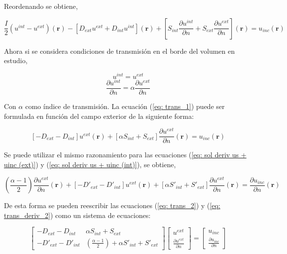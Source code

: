 \documentclass[12pt,letterpaper]{article}
\numberwithin{equation}{section}
\begin{document}
Reordenando se obtiene,

\begin{equation}
\frac{I}{2}(u^{int}- u^{ext})(\textbf{r}) - \left[D_{ext} u^{ext} + D_{int} u^{int}\right](\textbf{r}) + \left[S_{int} \frac{\partial u^{int}}{\partial n} + S_{ext} \frac{\partial u^{ext}}{\partial n}\right](\textbf{r}) = u_{inc}(\textbf{r}) 
\label{eq: trans_1}		
\end{equation}

Ahora si se considera condiciones de transmisión en el borde del volumen en estudio,

$$u^{int} = u^{ext}$$
$$\frac{\partial u^{int}}{\partial n} =\alpha \frac{\partial u^{ext}}{\partial n}$$

Con $\alpha$ como índice de transmisión. La ecuación (\ref{eq: trans_1}) puede ser formulada en función del campo exterior de la siguiente forma:

\begin{equation}
\left[-D_{ext} - D_{int}\right] u^{ext}(\textbf{r}) + \left[\alpha S_{int} + S_{ext}\right]\frac{\partial u^{ext}}{\partial n}(\textbf{r}) = u_{inc}(\textbf{r}) 
\label{eq: trans_2}		
\end{equation}

Se puede utilizar el mismo razonamiento para las ecuaciones (\ref{eq: sol deriv us + uinc (ext)}) y (\ref{eq: sol deriv us + uinc (int)}), se obtiene,

\begin{equation}
(\frac{\alpha - 1}{2})\frac{\partial u^{ext}}{\partial n}(\textbf{r}) + \left[-D'_{ext} - D'_{int}\right] u^{ext}(\textbf{r}) + \left[\alpha S'_{int} + S'_{ext}\right]\frac{\partial u^{ext}}{\partial n}(\textbf{r}) = \frac{\partial u_{inc}}{\partial n}(\textbf{r}) 
\label{eq: trans_deriv_2}		
\end{equation}

De esta forma se pueden reescribir las ecuaciones (\ref{eq: trans_2}) y (\ref{eq: trans_deriv_2}) como un sistema de ecuaciones:

\begin{equation} 
\begin{bmatrix}
-D_{ext} - D_{int} & \alpha S_{int} + S_{ext}\\
-D'_{ext} - D'_{int} & (\frac{\alpha - 1}{2})+\alpha S'_{int} + S'_{ext}
\end{bmatrix}
\begin{bmatrix}
u^{ext}\\
\frac{\partial u^{ext}}{\partial n}
\end{bmatrix}
=
\begin{bmatrix}
u_{inc}\\
\frac{\partial u_{inc}}{\partial n}
\end{bmatrix}
\label{eq:matriz trans}		 
\end{equation} 
\end{document}
